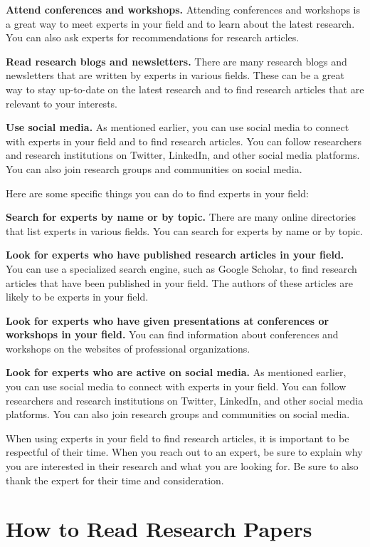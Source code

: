 \documentclass[
  b5paper]{book}
\begin{document}
\textbf{Attend conferences and workshops.} Attending conferences and workshops is a great way to meet experts in your field and to learn about the latest research. You can also ask experts for recommendations for research articles.

\textbf{Read research blogs and newsletters.} There are many research blogs and newsletters that are written by experts in various fields. These can be a great way to stay up-to-date on the latest research and to find research articles that are relevant to your interests.

\textbf{Use social media.} As mentioned earlier, you can use social media to connect with experts in your field and to find research articles. You can follow researchers and research institutions on Twitter, LinkedIn, and other social media platforms. You can also join research groups and communities on social media.

Here are some specific things you can do to find experts in your field:

\textbf{Search for experts by name or by topic.} There are many online directories that list experts in various fields. You can search for experts by name or by topic.

\textbf{Look for experts who have published research articles in your field.} You can use a specialized search engine, such as Google Scholar, to find research articles that have been published in your field. The authors of these articles are likely to be experts in your field.

\textbf{Look for experts who have given presentations at conferences or workshops in your field.} You can find information about conferences and workshops on the websites of professional organizations.

\textbf{Look for experts who are active on social media.} As mentioned earlier, you can use social media to connect with experts in your field. You can follow researchers and research institutions on Twitter, LinkedIn, and other social media platforms. You can also join research groups and communities on social media.

When using experts in your field to find research articles, it is important to be respectful of their time. When you reach out to an expert, be sure to explain why you are interested in their research and what you are looking for. Be sure to also thank the expert for their time and consideration.

\hypertarget{read}{%
\section{How to Read Research Papers}\label{read}}
\end{document}
